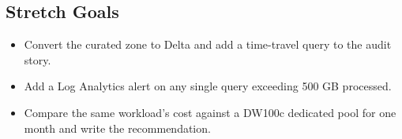 \subsection*{Stretch Goals}
\begin{itemize}
    \item Convert the curated zone to Delta and add a time-travel query to the audit story.
    \item Add a Log Analytics alert on any single query exceeding 500 GB processed.
    \item Compare the same workload's cost against a DW100c dedicated pool for one month and write the recommendation.
\end{itemize}
